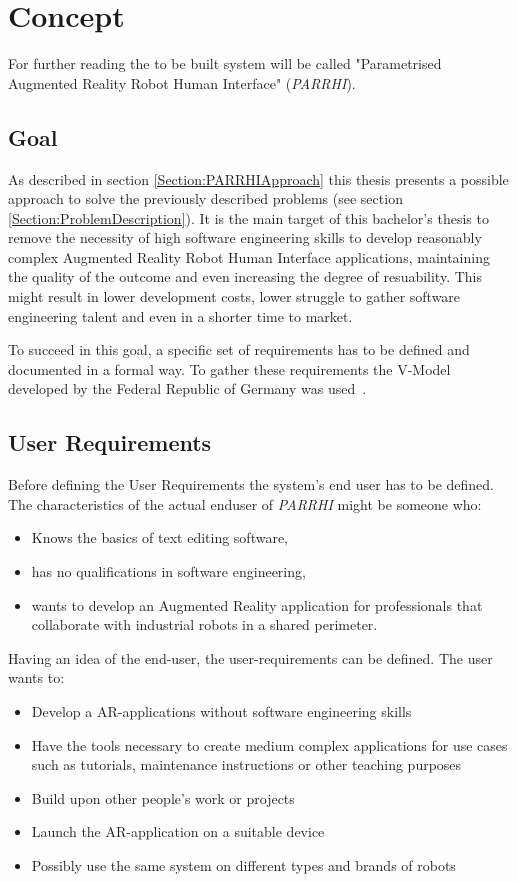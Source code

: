 \chapter{Concept}\label{Chap:Concept}

For further reading the to be built system will be called "Parametrised Augmented Reality Robot Human Interface" (\textit{PARRHI}).

\section{Goal}
As described in section \ref{Section:PARRHIApproach} this thesis presents a possible approach to solve the previously described problems (see section \ref{Section:ProblemDescription}). It is the main target of this bachelor's thesis to remove the necessity of high software engineering skills to develop reasonably complex Augmented Reality Robot Human Interface applications, maintaining the quality of the outcome and even increasing the degree of resuability. This might result in lower development costs, lower struggle to gather software engineering talent and even in a shorter time to market.

To succeed in this goal, a specific set of requirements has to be defined and documented in a formal way. To gather these requirements the V-Model developed by the Federal Republic of Germany was used~\cite{vmodell}.

\section{User Requirements}
Before defining the User Requirements the system's end user has to be defined. The characteristics of the actual enduser of \textit{PARRHI} might be someone who:
\begin{itemize}
	\setlength\itemsep{-1em}
	\item Knows the basics of text editing software,
	\item has no qualifications in software engineering,
	\item wants to develop an Augmented Reality application for professionals that collaborate with industrial robots in a shared perimeter.
\end{itemize}

Having an idea of the end-user, the user-requirements can be defined. The user wants to:
\begin{itemize}
	\setlength\itemsep{-1em}
	\item Develop a AR-applications without software engineering skills
	\item Have the tools necessary to create medium complex applications for use cases such as tutorials, maintenance instructions or other teaching purposes
	\item Build upon other people's work or projects
	\item Launch the AR-application on a suitable device
	\item Possibly use the same system on different types and brands of robots
\end{itemize}

